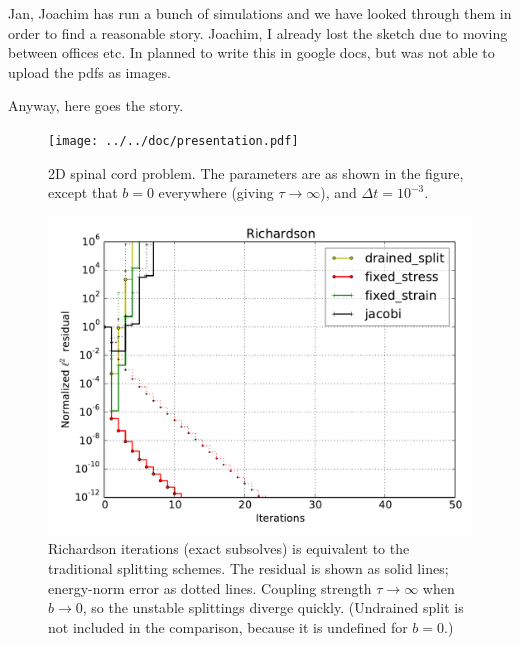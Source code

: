 \documentclass{article}
\begin{document}
Jan, Joachim has run a bunch of simulations and we have looked through them in order to find a reasonable story. 
Joachim, I already lost the sketch due to moving between offices etc. In planned to write this in google
docs, but was not able to upload the pdfs as images.  

Anyway, here goes the story. 


\begin{figure}
\begin{center}
\texttt{[image: ../../doc/presentation.pdf]}
\caption{2D spinal cord problem. The parameters are as shown in the figure, except that $b=0$ everywhere (giving $\tau\rightarrow\infty$), and $\Delta t=10^{-3}$.}
\end{center}
\end{figure}

\begin{figure}
\begin{center}
\includegraphics[width=0.49\linewidth]{../Richardson,problem=2,exact=1,N=64.pdf}
\caption{Richardson iterations (exact subsolves) is equivalent to the traditional splitting schemes. The residual is shown as solid lines; energy-norm error as dotted lines. Coupling strength $\tau\rightarrow\infty$ when $b\rightarrow 0$, so the unstable splittings diverge quickly. (Undrained split is not included in the comparison, because it is undefined for $b=0$.)} 
\label{2dsc-richardson-exact}
\end{center}
\end{figure}
\end{document}
